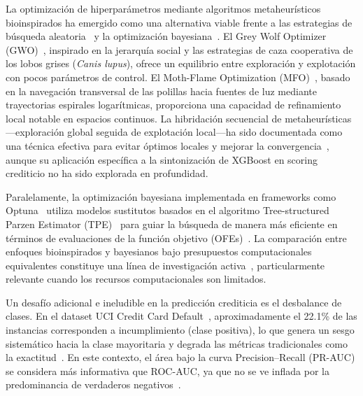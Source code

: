 \documentclass[journal]{IEEEtran}
\begin{document}
La optimización de hiperparámetros mediante algoritmos metaheurísticos bioinspirados ha emergido como una alternativa viable frente a las estrategias de búsqueda aleatoria~\cite{bergstra2012} y la optimización bayesiana~\cite{snoek2012}. El Grey Wolf Optimizer (GWO)~\cite{mirjalili2014}, inspirado en la jerarquía social y las estrategias de caza cooperativa de los lobos grises (\textit{Canis lupus}), ofrece un equilibrio entre exploración y explotación con pocos parámetros de control. El Moth-Flame Optimization (MFO)~\cite{mirjalili2015}, basado en la navegación transversal de las polillas hacia fuentes de luz mediante trayectorias espirales logarítmicas, proporciona una capacidad de refinamiento local notable en espacios continuos. La hibridación secuencial de metaheurísticas---exploración global seguida de explotación local---ha sido documentada como una técnica efectiva para evitar óptimos locales y mejorar la convergencia~\cite{yang2010, blum2003}, aunque su aplicación específica a la sintonización de XGBoost en scoring crediticio no ha sido explorada en profundidad.

Paralelamente, la optimización bayesiana implementada en frameworks como Optuna~\cite{akiba2019} utiliza modelos sustitutos basados en el algoritmo Tree-structured Parzen Estimator (TPE)~\cite{bergstra2011} para guiar la búsqueda de manera más eficiente en términos de evaluaciones de la función objetivo (OFEs)~\cite{snoek2012}. La comparación entre enfoques bioinspirados y bayesianos bajo presupuestos computacionales equivalentes constituye una línea de investigación activa~\cite{hutter2011}, particularmente relevante cuando los recursos computacionales son limitados.

Un desafío adicional e ineludible en la predicción crediticia es el desbalance de clases. En el dataset UCI Credit Card Default~\cite{yeh2009}, aproximadamente el 22.1\% de las instancias corresponden a incumplimiento (clase positiva), lo que genera un sesgo sistemático hacia la clase mayoritaria y degrada las métricas tradicionales como la exactitud~\cite{he2009}. En este contexto, el área bajo la curva Precision--Recall (PR-AUC) se considera más informativa que ROC-AUC, ya que no se ve inflada por la predominancia de verdaderos negativos~\cite{davis2006, saito2015}.
\end{document}
